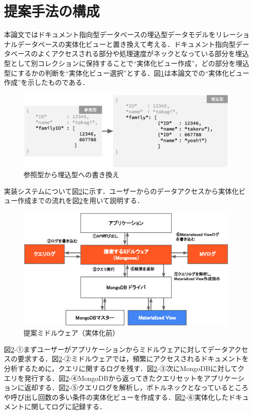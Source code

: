 \documentclass[a4paper,11pt]{ujreport}
\begin{document}
\section{提案手法の構成}
\label{section:ProposedAlgorithmArchitecture}
本論文ではドキュメント指向型データベースの埋込型データモデルをリレーショナルデータベースの実体化ビューと置き換えて考える．ドキュメント指向型データベースのよくアクセスされる部分や処理速度がネックとなっている部分を埋込型として別コレクションに保持することで“実体化ビュー作成”，どの部分を埋込型にするかの判断を“実体化ビュー選択”とする．図\ref{figure:ReferenceToEmbed}は本論文での“実体化ビュー作成”を示したものである．
\begin{figure}[htbp]
	\begin{center}
		\includegraphics[width=30em, trim=0 13em 0 0]{src/ReferenceToEmbed.eps} %
	\end{center}
	\caption{参照型から埋込型への書き換え}
	\label{figure:ReferenceToEmbed}
\end{figure}

実装システムについて図\ref{figure:Midleware}に示す．ユーザーからのデータアクセスから実体化ビュー作成までの流れを図\ref{figure:Midleware}を用いて説明する．
\begin{figure}[h]
	\begin{center}
		\includegraphics[width=30em]{src/Midleware.eps}
	\end{center}
	\caption{提案ミドルウェア（実体化前）}
	\label{figure:Midleware}
\end{figure}
図\ref{figure:Midleware}-①まずユーザーがアプリケーションからミドルウェアに対してデータアクセスの要求する．図\ref{figure:Midleware}-②ミドルウェアでは，頻繁にアクセスされるドキュメントを分析するために，クエリに関するログを残す．図\ref{figure:Midleware}-③次にMongoDBに対してクエリを発行する．図\ref{figure:Midleware}-④MongoDBから返ってきたクエリセットをアプリケーションに返却する．図\ref{figure:Midleware}-⑤クエリログを解析し，ボトルネックとなっているところや呼び出し回数の多い条件の実体化ビューを作成する．図\ref{figure:Midleware}-⑥実体化したドキュメントに関してログに記録する．
\end{document}
